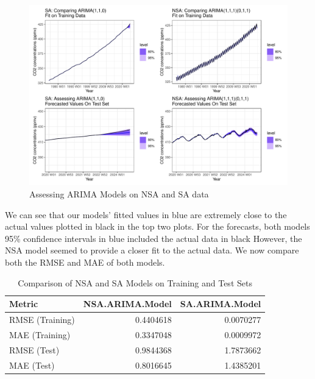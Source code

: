 \documentclass[
]{article}
\begin{document}
\newpage

\begin{figure}

{\centering \includegraphics[width=1\linewidth]{lab_prompt_Updated_files/figure-latex/final-forecasts-1} 

}

\caption{Assessing ARIMA Models on NSA and SA data}\label{fig:final-forecasts}
\end{figure}

We can see that our models' fitted values in blue are extremely close to the actual values plotted in black in the top two plots. For the forecasts, both models 95\% confidence intervals in blue included the actual data in black However, the NSA model seemed to provide a closer fit to the actual data. We now compare both the RMSE and MAE of both models.

\begin{table}[H]
\centering
\caption{\label{tab:final-models-comparison-table}Comparison of NSA and SA Models on Training and Test Sets}
\centering
\fontsize{9}{11}\selectfont
\begin{tabular}[t]{l|r|r}
\hline
Metric & NSA.ARIMA.Model & SA.ARIMA.Model\\
\hline
RMSE (Training) & 0.4404618 & 0.0070277\\
\hline
MAE (Training) & 0.3347048 & 0.0009972\\
\hline
RMSE (Test) & 0.9844368 & 1.7873662\\
\hline
MAE (Test) & 0.8016645 & 1.4385201\\
\hline
\end{tabular}
\end{table}
\end{document}
